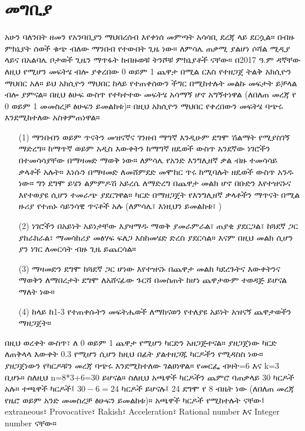 \documentclass[a4paper,12pt]{article}
\newenvironment{geez}{\geezfont}{}
\theoremstyle{mystyle}
\numberwithin{equation}{section}
\numberwithin{theorem}{section}
\numberwithin{proposition}{section}
\numberwithin{example}{section}
\numberwithin{remark}{section}
\numberwithin{lemma}{section}
\numberwithin{corollary}{section}
\numberwithin{definition}{section}
\numberwithin{amharicdefinition}{section}
\begin{document}
\section{\begin{geez}መግቢያ\end{geez}}
\label{S:2}
አሁን ባለንበት ዘመን የአንባቢያን ማህበረሰብ እየቀነሰ መምጣት አሳሳቢ ደረጃ ላይ ደርሷል። በብዙ ምክኒያት ሰወች ቁጭ ብለው
ማንበብ የተውበት ጊዜ ነው። ለምሳሌ ጠቃሚ ያልሆነ ሶሻል
ሚዲያ ላይና በአልባሌ ቦታወች ጊዜን ማጥፋት ከብዙወቹ ትንሾቹ ምክኒያቶች ናቸው። በ2017 ዓ.ም ዳኛቸው ለዚህ የሚሆን መፍትሄ ብሎ ያቀረበው 0 ወይም 1 ጨዋታ በሚል ርእስ የተዘጋጀ ትልቅ አክሲዮን ማህበር አለ። ይህ አክሲዮን ማህበር ከላይ የተጠቀሰውን ችግር በሚከተሉት መልኩ መፍታት ይቻላል ብሎ ያምናል። በዚህ ፅሁፍ ውስጥ የተካተተው መፍትሄ አሳማኝ ሆኖ አግኝተነዋል (ለበለጠ መረጃ የ 0 ወይም 1 መመስረቻ ፅሁፍን ይመልከቱ)። በዚህ አክሲዮን ማህበር የቀረበውን መፍትሄ ባጭሩ እንደሚከተለው አስቀምጠነዋል። 
\begin{enumerate}
\item[(1)] ማንበብን ወይም ጥናትን መዝናኛና ገንዘብ ማግኛ እንዲሁም ደግሞ ሽልማት የሚያስገኝ ማድረግ። ከማጥኛ ወይም አዲስ እውቀትን ከማግኛ  ዘዴወች ውስጥ አንደኛው ነገሮችን በተመሳሳያቸው በማዛመድ ማወቅ ነው። ለምሳሌ የአንድ እንግሊዘኛ ቃል ብዙ ተመሳሳይ ቃላቶች አሉት። እነሱን በማዛመድ ለመሸምደድ መሞከር ጥሩ ከሚባሉት ዘዴወች ውስጥ አንዱ ነው። ግን ደግሞ ይሄን ልምምዶሽ አይረሴ ለማድረግ በጨዋታ መልክ ሆኖ በቡድን እየተዝናኑና እየተወያዩ ሲሆን ተመራጭ ያደርገዋል።
ካርድ በማዘጋጀት የእንግሊዘኛ ቃላቶችን ማጥናት በሚል ዙሪያ የተጠኑ ሳይንሳዊ ጥናቶች አሉ (ለምሳሌ፣ እነዚህን ይመልከቱ፣ 
\cite{aslan2011teaching,azabdaftari2012comparing,bryson2012using,kosim2013improving,
 nikoopour2014vocabulary,
nugroho2012improving,
saputri2017improving,senzaki2017reinventing,sitompul2013teaching,
wahyuni2014flashcards})
\item[(2)] ነገሮችን በአይነት አይነታቸው እያዛማዱ ማወቅ ያመራምራል፣ ጠያቂ ያደርጋል፣ ከጓደኛ ጋር ያከራክራል፣ ማመሳከሪያ መፅሃፍ ፍለጋ እስከመሄድ ድረስ ያደርሳል። እናም በዚህ መልክ ሲሆን ያን ነገር ለመርሳት ብዙ ጊዜ ይጨርሳል። 
\item[(3)] ማዛመድን ደግሞ ከጓደኛ ጋር ሆነው እየተዝናኑ በጨዋታ መልክ ካደረጉትና እውቀትንና ማወቅን ለማበረታት ደግሞ ለአሸናፊው ጉርሻ በመስጠት ከሆነ ጨዋታውም ተወዳጅ ይሆናል ማለት ነው።
\item[(4)] ከላይ ከ1-3 የተጠቀሱትን መፍትሔወች ለማከናወን የተለያዩ አይነት አዝናኝ ጨዋታወችን ማዘጋጀት።
\end{enumerate}
በዚህ ወረቀት ውስጥ፣ ለ 0 ወይም 1 ጨዋታ የሚሆን ካርድን አዘጋጅተናል። ያዘጋጀነው ካርድ ለጠቅላላ እውቀት 0.3 የሚሆን ሲሆን ከዚህ በፊት ያልተዘጋጁ ካርዶችን የሚዳስስ ነው። ያዘጋጀነውን የካርዶቹን መረጃ ባጭሩ እንደሚከተለው ገልፀነዋል። የመርፌ ብዛት=6 እና k=3 ቢሆኑ። ስለዚህ n=8*3+6=30 ይሆናል። ስለዚህ አጫዋች ካርዶችን ጨምሮ ባጠቃላይ 30 ካርዶች አሉ። ተጫዋች ካርዶች፤ $30-6=24$ ካርዶች ይሆናሉ፤ 24 ደግሞ የ 8 ብዜት ነው (ለበለጠ መረጃ የዜሮ ወይም አንድ መመስረቻ ፅሁፍን ይመልከቱ)።  አጫዋች ካርዶች የሚከተሉት ናቸው፤ extraneous፣ Provocative፣ Rakish፣ Acceleration፣ Rational number እና  Integer number ናቸው።
\end{document}
